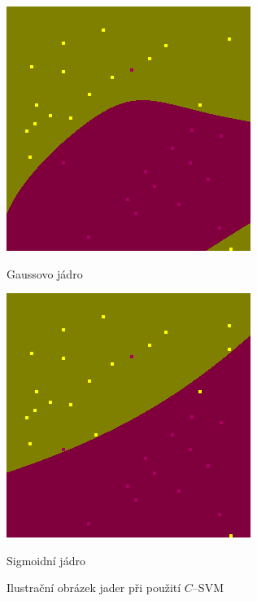 \begin{figure}[H]
\begin{minipage}[b]{0.4\linewidth}
    \includegraphics[width=.7\linewidth]{figures/rbf} 
    \caption*{Gaussovo jádro} 
    \vspace{4ex}
    \label{rbfKernel} 
  \end{minipage}%
  \begin{minipage}[b]{0.4\linewidth}
    \centering
    \includegraphics[width=.7\linewidth]{figures/sigm}
    \caption*{Sigmoidní jádro} 
    \vspace{4ex}
    \label{sigmKernel} 
  \end{minipage} 
  \caption{Ilustrační obrázek jader při použití $C$--SVM \cite{libsvm}}
  \label{kernels} 
\end{figure}

